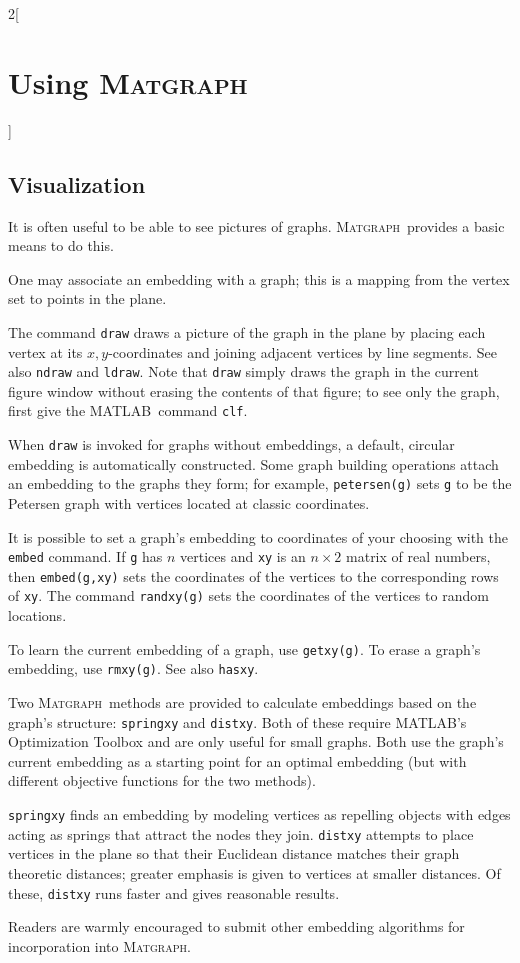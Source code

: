 \documentclass{amsart}
\newcommand\matlab{MATLAB}
\newcommand\matgraph{\textsc{Matgraph}}
\begin{document}
\begin{multicols}{2}[\section{Using \matgraph}]
\subsection{Visualization}

It is often useful to be able to see pictures of graphs. \matgraph\
provides a basic means to do this. 

One may associate an embedding with a graph; this is a mapping from
the vertex set to points in the plane.

The command \verb|draw| draws a picture of the graph in the plane by
placing each vertex at its $x,y$-coordinates and joining adjacent
vertices by line segments. See also \verb|ndraw| and \verb|ldraw|.
Note that \verb|draw| simply draws the graph in the current figure
window without erasing the contents of that figure; to see only the
graph, first give the \matlab\ command \verb|clf|.

When \verb|draw| is invoked for graphs without embeddings, a default,
circular embedding is automatically constructed. Some graph building
operations attach an embedding to the graphs they form; for example,
\verb|petersen(g)| sets \verb|g| to be the Petersen graph with
vertices located at classic coordinates. 

It is possible to set a graph's embedding to coordinates of your
choosing with the \verb|embed| command. If \verb|g| has $n$ vertices
and \verb|xy| is an $n\times2$ matrix of real numbers, then
\verb|embed(g,xy)| sets the coordinates of the vertices to the
corresponding rows of \verb|xy|. The command \verb|randxy(g)| sets the
coordinates of the vertices to random locations. 

To learn the current embedding of a graph, use \verb|getxy(g)|. To
erase a graph's embedding, use \verb|rmxy(g)|. See also \verb|hasxy|.

Two \matgraph\ methods are provided to calculate embeddings based on
the graph's structure: \verb|springxy| and \verb|distxy|. Both of
these require \matlab's Optimization Toolbox and are only useful for
small graphs. Both use the graph's current embedding as a starting point
for an optimal embedding (but with different objective functions for
the two methods). 

\verb|springxy| finds an embedding by modeling vertices as repelling
objects with edges acting as springs that attract the nodes they join.
\verb|distxy| attempts to place vertices in the plane so that their
Euclidean distance matches their graph theoretic distances; greater
emphasis is given to vertices at smaller distances. Of these,
\verb|distxy| runs faster and gives reasonable results.

Readers are warmly encouraged to submit other embedding algorithms
for incorporation into \matgraph. 

\end{multicols}
\end{document}
